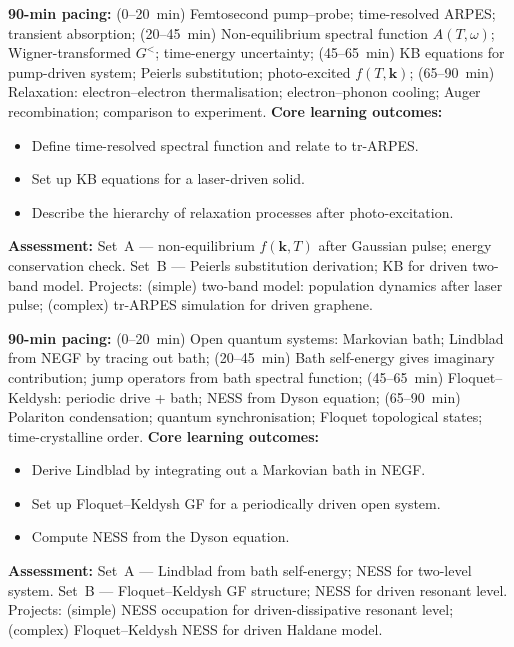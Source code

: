 \documentclass[11pt,a4paper]{article}
\begin{document}
\medskip

\begin{tcolorbox}[modulebox, title={Module~II.5 / L10: Pump--Probe Dynamics}]
\textbf{90-min pacing:} (0--20~min) Femtosecond pump--probe; time-resolved ARPES; transient absorption; (20--45~min) Non-equilibrium spectral function $A(T,\omega)$; Wigner-transformed $G^<$; time-energy uncertainty; (45--65~min) KB equations for pump-driven system; Peierls substitution; photo-excited $f(T,\mathbf{k})$; (65--90~min) Relaxation: electron--electron thermalisation; electron--phonon cooling; Auger recombination; comparison to experiment.
\medskip\textbf{Core learning outcomes:}
\begin{itemize}[leftmargin=1.4em,topsep=2pt,itemsep=1pt]
  \item Define time-resolved spectral function and relate to tr-ARPES.
  \item Set up KB equations for a laser-driven solid.
  \item Describe the hierarchy of relaxation processes after photo-excitation.
\end{itemize}
\medskip\textbf{Assessment:}
Set~A --- non-equilibrium $f(\mathbf{k},T)$ after Gaussian pulse; energy conservation check.
Set~B --- Peierls substitution derivation; KB for driven two-band model.
Projects: (simple) two-band model: population dynamics after laser pulse; (complex) tr-ARPES simulation for driven graphene.
\end{tcolorbox}

\medskip

\begin{tcolorbox}[modulebox, title={Module~II.5 / L11: Driven-Dissipative Systems}]
\textbf{90-min pacing:} (0--20~min) Open quantum systems: Markovian bath; Lindblad from NEGF by tracing out bath; (20--45~min) Bath self-energy gives imaginary contribution; jump operators from bath spectral function; (45--65~min) Floquet--Keldysh: periodic drive + bath; NESS from Dyson equation; (65--90~min) Polariton condensation; quantum synchronisation; Floquet topological states; time-crystalline order.
\medskip\textbf{Core learning outcomes:}
\begin{itemize}[leftmargin=1.4em,topsep=2pt,itemsep=1pt]
  \item Derive Lindblad by integrating out a Markovian bath in NEGF.
  \item Set up Floquet--Keldysh GF for a periodically driven open system.
  \item Compute NESS from the Dyson equation.
\end{itemize}
\medskip\textbf{Assessment:}
Set~A --- Lindblad from bath self-energy; NESS for two-level system.
Set~B --- Floquet--Keldysh GF structure; NESS for driven resonant level.
Projects: (simple) NESS occupation for driven-dissipative resonant level; (complex) Floquet--Keldysh NESS for driven Haldane model.
\end{tcolorbox}
\end{document}
